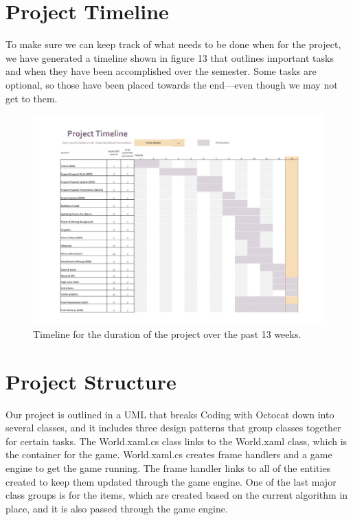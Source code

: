 \documentclass[10pt,conference,onecolumn,compsoc]{IEEEtran}
\begin{document}
\clearpage

\section{Project Timeline}
To make sure we can keep track of what needs to be done when for the project, we have generated a timeline shown in figure 13 that outlines important tasks and when they have been accomplished over the semester. Some tasks are optional, so those have been placed towards the end—even though we may not get to them.

\begin{figure}[!ht]
\centering
\includegraphics[scale=.7]{Timeline_Update}
\caption{Timeline for the duration of the project over the past 13 weeks.}
\end{figure}

\section{Project Structure}
Our project is outlined in a UML that breaks Coding with Octocat down into several classes, and it includes three design patterns that group classes together for certain tasks. The World.xaml.cs class links to the World.xaml class, which is the container for the game. World.xaml.cs creates frame handlers and a game engine to get the game running. The frame handler links to all of the entities created to keep them updated through the game engine. One of the last major class groups is for the items, which are created based on the current algorithm in place, and it is also passed through the game engine.
\end{document}
